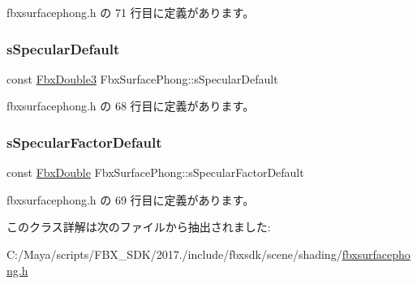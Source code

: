 fbxsurfacephong.\+h の 71 行目に定義があります。

\mbox{\label{class_fbx_surface_phong_ab42f5855747a5699e65b6dd6332b3f70}} 
\subsubsection{\texorpdfstring{s\+Specular\+Default}{sSpecularDefault}}
{\footnotesize\ttfamily const \hyperlink{fbxtypes_8h_ae0a96f14cde566774c7553aa7523b7a7}{Fbx\+Double3} Fbx\+Surface\+Phong\+::s\+Specular\+Default\hspace{0.3cm}{\ttfamily [static]}}



 fbxsurfacephong.\+h の 68 行目に定義があります。

\mbox{\label{class_fbx_surface_phong_a4906b3c1de363105b0e0c32be098b7a5}} 
\subsubsection{\texorpdfstring{s\+Specular\+Factor\+Default}{sSpecularFactorDefault}}
{\footnotesize\ttfamily const \hyperlink{fbxtypes_8h_a171e72a1c46fc15c1a6c9c31948c1c5b}{Fbx\+Double} Fbx\+Surface\+Phong\+::s\+Specular\+Factor\+Default\hspace{0.3cm}{\ttfamily [static]}}



 fbxsurfacephong.\+h の 69 行目に定義があります。



このクラス詳解は次のファイルから抽出されました\+:\begin{DoxyCompactItemize}
\item 
C\+:/\+Maya/scripts/\+F\+B\+X\+\_\+\+S\+D\+K/2017./include/fbxsdk/scene/shading/\hyperlink{fbxsurfacephong_8h}{fbxsurfacephong.\+h}\end{DoxyCompactItemize}
